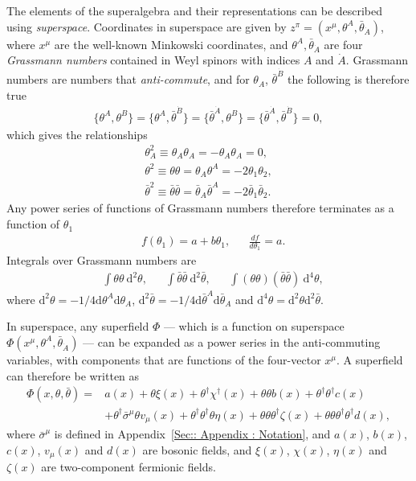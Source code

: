 \documentclass[twoside,english]{uiofysmaster}
\begin{document}
The elements of the superalgebra and their representations can be described using \textit{superspace}. Coordinates in superspace are given by $z^{\pi} = (x^{\mu}, \theta^A, \bar{\theta}_{\dot{A}})$, where $x^{\mu}$ are the well-known Minkowski coordinates, and $\theta^A, \bar{\theta}_{\dot{A}}$ are four \textit{Grassmann numbers} contained in Weyl spinors with indices $A$ and $\dot{A}$. Grassmann numbers are numbers that \textit{anti-commute}, and for $\theta_A$, $\bar{\theta}^{\dot{B}}$ the following is therefore true
\begin{align}
\{ \theta^A, \theta^B\} = \{ \theta^A, \bar{\theta}^{\dot{B}}\} = \{ \bar{\theta}^{\dot{A}}, \theta^B\} = \{ \bar{\theta}^{\dot{A}}, \bar{\theta}^{\dot{B}} \} =0,
\end{align}
which gives the relationships
\begin{align}
\theta_A^2 \equiv \theta_A \theta_A = - \theta_A \theta_A =  0,\\
\theta^2 \equiv \theta \theta = \theta_A \theta^A = -2 \theta_1 \theta_2,\\
\bar{\theta}^2 \equiv \bar{\theta} \bar{\theta} = \bar{\theta}_A \bar{\theta}^A = -2 \bar{\theta}_1 \bar{\theta}_2. 
\end{align}
Any power series of functions of Grassmann numbers therefore terminates as a function of $\theta_1$
\begin{align}
&f(\theta_1) = a + b \theta_1, && \frac{d f}{d \theta_1} = a.
\end{align}
Integrals over Grassmann numbers are 
\begin{align}
& \int \theta \theta~\mathrm{d}^2\theta, && \int \bar{\theta} \bar{\theta} ~ \mathrm{d}^2 \bar{\theta}, && \int (\theta \theta) (\bar{\theta} \bar{\theta})~\mathrm{d}^4 \theta,
\end{align}
where $\mathrm{d}^2\theta = - 1/4 \mathrm{d} \theta^A \mathrm{d}\theta_A$, $\mathrm{d}^2\bar{\theta} = - 1/4 \mathrm{d} \bar{\theta}^A \mathrm{d}\bar{\theta}_A$ and $\mathrm{d}^4 \theta = \mathrm{d}^2 \theta \mathrm{d}^2 \bar{\theta}$.

In superspace, any superfield $\Phi$ --- which is a function on superspace $\Phi(x^{\mu}, \theta^A, \bar{\theta}_{\dot{A}})$ --- can be expanded as a power series in the anti-commuting variables, with components that are functions of the four-vector $x^{\mu}$. A superfield  can therefore be written as 
\begin{align}\label{Eq:: phys back : Superfield general}
\Phi(x, \theta, \bar{\theta}) =& a(x) + \theta \xi(x) + \theta^{\dagger} \chi^{\dagger}(x) + \theta \theta b(x) + \theta^{\dagger} \theta^{\dagger} c(x)\nonumber \\ &+ \theta^{\dagger} \bar{\sigma}^{\mu} \theta v_{\mu}(x) + \theta^{\dagger} \theta^{\dagger} \theta \eta(x) + \theta \theta \theta^{\dagger} \zeta(x) + \theta \theta \theta^{\dagger} \theta^{\dagger} d(x) , 
\end{align}
where $\bar{\sigma}^{\mu}$ is defined in Appendix~\ref{Sec:: Appendix : Notation}, and $a(x)$, $b(x)$, $c(x)$, $v_{\mu}(x)$ and $d(x)$ are bosonic fields, and $\xi(x)$, $\chi(x)$, $\eta(x)$ and $\zeta(x)$ are two-component fermionic fields.
\end{document}
